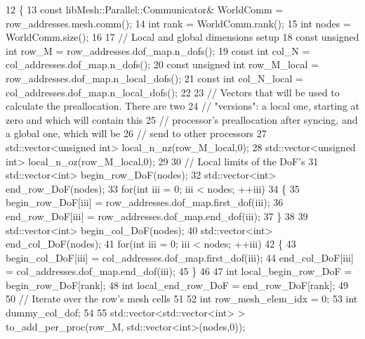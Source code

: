 \begin{DoxyCode}
12 \{
13     \textcolor{keyword}{const} libMesh::Parallel::Communicator& WorldComm = row\_addresses.mesh.comm();
14     \textcolor{keywordtype}{int} rank = WorldComm.rank();
15     \textcolor{keywordtype}{int} nodes = WorldComm.size();
16 
17     \textcolor{comment}{// Local and global dimensions setup}
18     \textcolor{keyword}{const} \textcolor{keywordtype}{unsigned} \textcolor{keywordtype}{int} row\_M = row\_addresses.dof\_map.n\_dofs();
19     \textcolor{keyword}{const} \textcolor{keywordtype}{int} col\_N = col\_addresses.dof\_map.n\_dofs();
20     \textcolor{keyword}{const} \textcolor{keywordtype}{unsigned} \textcolor{keywordtype}{int} row\_M\_local = row\_addresses.dof\_map.n\_local\_dofs();
21     \textcolor{keyword}{const} \textcolor{keywordtype}{int} col\_N\_local = col\_addresses.dof\_map.n\_local\_dofs();
22 
23     \textcolor{comment}{// Vectors that will be used to calculate the preallocation. There are two}
24     \textcolor{comment}{// "versions": a local one, starting at zero and which will contain this}
25     \textcolor{comment}{// processor's preallocation after syncing, and a global one, which will be}
26     \textcolor{comment}{// send to other processors}
27     std::vector<unsigned int> local\_n\_nz(row\_M\_local,0);
28     std::vector<unsigned int> local\_n\_oz(row\_M\_local,0);
29 
30     \textcolor{comment}{// Local limits of the DoF's}
31     std::vector<int> begin\_row\_DoF(nodes);
32     std::vector<int> end\_row\_DoF(nodes);
33     \textcolor{keywordflow}{for}(\textcolor{keywordtype}{int} iii = 0; iii < nodes; ++iii)
34     \{
35         begin\_row\_DoF[iii] = row\_addresses.dof\_map.first\_dof(iii);
36         end\_row\_DoF[iii] = row\_addresses.dof\_map.end\_dof(iii);
37     \}
38 
39     std::vector<int> begin\_col\_DoF(nodes);
40     std::vector<int> end\_col\_DoF(nodes);
41     \textcolor{keywordflow}{for}(\textcolor{keywordtype}{int} iii = 0; iii < nodes; ++iii)
42     \{
43         begin\_col\_DoF[iii] = col\_addresses.dof\_map.first\_dof(iii);
44         end\_col\_DoF[iii] = col\_addresses.dof\_map.end\_dof(iii);
45     \}
46 
47     \textcolor{keywordtype}{int} local\_begin\_row\_DoF = begin\_row\_DoF[rank];
48     \textcolor{keywordtype}{int} local\_end\_row\_DoF = end\_row\_DoF[rank];
49 
50     \textcolor{comment}{// Iterate over the row's mesh cells}
51 
52     \textcolor{keywordtype}{int} row\_mesh\_elem\_idx = 0;
53     \textcolor{keywordtype}{int} dummy\_col\_dof;
54 
55     std::vector<std::vector<int> > to\_add\_per\_proc(row\_M, std::vector<int>(nodes,0));

\end{DoxyCode}
